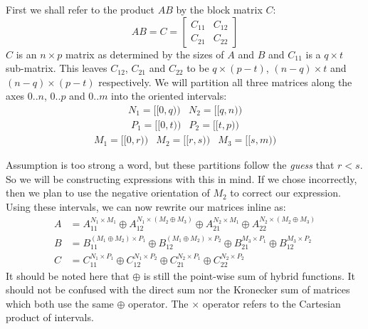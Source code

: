 First we shall refer to the product $AB$ by the block matrix $C$:
\begin{equation}
	AB = C = \begin{bmatrix} C_{11} & C_{12} \\ C_{21} & C_{22} \end{bmatrix}
\end{equation}
$C$ is an $n \times p$ matrix as determined by the sizes of $A$ and $B$ and $C_{11}$ is a $q \times t$ sub-matrix.
This leaves $C_{12}$, $C_{21}$ and $C_{22}$ to be $q \times (p-t)$, $(n-q) \times t$ and $(n-q) \times (p-t)$ respectively.
We will partition all three matrices along the axes $0.. n$, $0..p$ and $0..m$ into the oriented intervals:
\begin{equation*}\begin{array}{cc}
	N_1 = [\![0, q)\!) & N_2 = [\![q, n)\!) 
\end{array}\end{equation*}
\begin{equation*}\begin{array}{cc}
	P_1 = [\![0, t)\!) & P_2 = [\![t, p)\!)
\end{array}\end{equation*}
\begin{equation*}\begin{array}{ccc}
	M_1 = [\![0, r)\!) & M_2 = [\![r, s)\!) & M_3 = [\![s, m)\!)
\end{array}\end{equation*}


Assumption is too strong a word, but these partitions follow the \emph{guess} that $r<s$.
So we will be constructing expressions with this in mind. 
If we chose incorrectly, then we plan to use the negative orientation of $M_2$ to correct our expression.
Using these intervals, we can now rewrite our matrices inline as:
\begin{align}
	A & =	A_{11}^{N_1 \times M_1} \oplus A_{12}^{N_1 \times (M_2 \oplus M_3)} \oplus 
			A_{21}^{N_2 \times M_1} \oplus A_{22}^{N_2 \times (M_2 \oplus M_3)} \\
	B & =	B_{11}^{(M_1 \oplus M_2) \times P_1} \oplus B_{12}^{(M_1 \oplus M_2) \times P_2} \oplus 
			B_{21}^{M_3 \times P_1} \oplus B_{12}^{M_3 \times P_2}\\
	C & =	C_{11}^{N_1 \times P_1} \oplus C_{12}^{N_1 \times P_2} \oplus
			C_{21}^{N_2 \times P_1} \oplus C_{22}^{N_2 \times P_2}
\end{align}
It should be noted here that $\oplus$ is still the point-wise sum of hybrid functions.
It should not be confused with the direct sum nor the Kronecker sum of matrices which both use the same $\oplus$ operator.
The $\times$ operator refers to the Cartesian product of intervals. 


